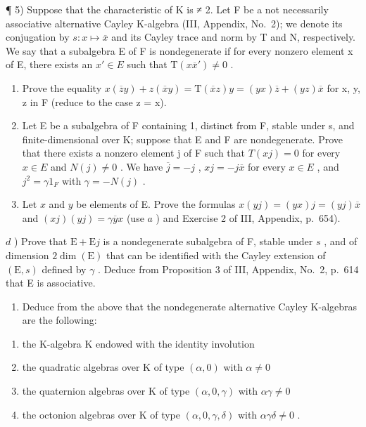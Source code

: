 ¶ 5) Suppose that the characteristic of K is ≠ 2. Let F be a not necessarily associative alternative Cayley K-algebra (III, Appendix, No.~2); we denote its conjugation by \(s : x \mapsto \overline{x}\) and its Cayley trace and norm by T and N, respectively. We say that a subalgebra E of F is nondegenerate if for every nonzero element x of E, there exists an \(x' \in E\) such that \(\mathrm{T}(x\overline{x}') \neq 0\) .

\begin{enumerate}
\def\labelenumi{\alph{enumi})}
\item
  Prove the equality \(x(\overline{z}y) + z(\overline{x}y) = \mathrm{T}(\overline{x}z)y = (yx)\overline{z} + (yz)\overline{x}\) for x, y, z in F (reduce to the case z = x).
\item
  Let E be a subalgebra of F containing 1, distinct from F, stable under s, and finite-dimensional over K; suppose that E and F are nondegenerate. Prove that there exists a nonzero element j of F such that \(T(xj) = 0\) for every \(x \in E\) and \(N(j) \neq 0\) . We have \(\overline{j} = -j\) , \(xj = -j\overline{x}\) for every \(x \in E\) , and \(j^{2} = \gamma1_{F}\) with \(\gamma = -N(j)\) .
\item
  Let \(x\) and \(y\) be elements of E. Prove the formulas \(x(yj) = (yx)j = (yj)\overline{x}\) and \((xj)(yj) = \gamma \overline{y}x\) (use \(a\) ) and Exercise 2 of III, Appendix, p.~654).
\end{enumerate}

\(d\) ) Prove that \(\mathrm{E} + \mathrm{E}j\) is a nondegenerate subalgebra of F, stable under \(s\) , and of dimension \(2\dim (\mathrm{E})\) that can be identified with the Cayley extension of \((\mathrm{E},s)\) defined by \(\gamma\) . Deduce from Proposition 3 of III, Appendix, No.~2, p.~614 that E is associative.

\begin{enumerate}
\def\labelenumi{\alph{enumi})}
\setcounter{enumi}{4}
\tightlist
\item
  Deduce from the above that the nondegenerate alternative Cayley K-algebras are the following:
\end{enumerate}

\begin{enumerate}
\def\labelenumi{(\roman{enumi})}
\item
  the K-algebra \(\mathrm{K}\) endowed with the identity involution
\item
  the quadratic algebras over K of type \((\alpha,0)\) with \(\alpha\neq0\)
\item
  the quaternion algebras over K of type \((\alpha,0,\gamma)\) with \(\alpha\gamma\neq0\)
\item
  the octonion algebras over \(\mathrm{K}\) of type \((\alpha, 0, \gamma, \delta)\) with \(\alpha \gamma \delta \neq 0\) .
\end{enumerate}

